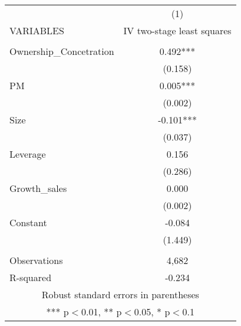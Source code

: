 \documentclass[]{article}
\begin{document}
\begin{tabular}{lc} \hline
 & (1) \\
VARIABLES & IV two-stage least squares \\ \hline
 &  \\
Ownership\_Concetration & 0.492*** \\
 & (0.158) \\
PM & 0.005*** \\
 & (0.002) \\
Size & -0.101*** \\
 & (0.037) \\
Leverage & 0.156 \\
 & (0.286) \\
Growth\_sales & 0.000 \\
 & (0.002) \\
Constant & -0.084 \\
 & (1.449) \\
 &  \\
Observations & 4,682 \\
 R-squared & -0.234 \\ \hline
\multicolumn{2}{c}{ Robust standard errors in parentheses} \\
\multicolumn{2}{c}{ *** p$<$0.01, ** p$<$0.05, * p$<$0.1} \\
\end{tabular}
\end{document}
